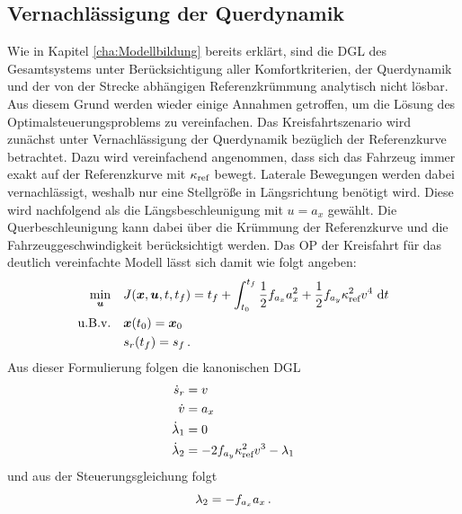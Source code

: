 \subsection{Vernachlässigung der Querdynamik}\label{subsec:Kreisfahrt_ohne_Querdynamik}
Wie in Kapitel \ref{cha:Modellbildung} bereits erklärt, sind die \gls{DGL} des Gesamtsystems unter Berücksichtigung aller Komfortkriterien, der Querdynamik und der von der Strecke abhängigen Referenzkrümmung analytisch nicht lösbar. Aus diesem Grund werden wieder einige Annahmen getroffen, um die Lösung des Optimalsteuerungsproblems zu vereinfachen. Das Kreisfahrtszenario wird zunächst unter Vernachlässigung der Querdynamik bezüglich der Referenzkurve betrachtet. Dazu wird vereinfachend angenommen, dass sich das Fahrzeug immer exakt auf der Referenzkurve mit $\kappa_{\textrm{ref}}$ bewegt. Laterale Bewegungen werden dabei vernachlässigt, weshalb nur eine Stellgröße in Längsrichtung benötigt wird. Diese wird nachfolgend als die Längsbeschleunigung mit $u = a_x$ gewählt. Die Querbeschleunigung kann dabei über die Krümmung der Referenzkurve und die Fahrzeuggeschwindigkeit berücksichtigt werden. Das \gls{OP} der Kreisfahrt für das deutlich vereinfachte Modell lässt sich damit wie folgt angeben: 
\begin{align}
\min_{\boldsymbol{u}} \quad & J(\boldsymbol{x},\boldsymbol{u},t,t_f) = t_f + \int_{t_0}^{t_f}\frac{1}{2}f_{a_x} a_x^2 + \frac{1}{2}f_{a_y} \kappa_{\textrm{ref}}^2v^4~\textrm{d}{t} \\
\textrm{u.B.v.} \quad& \boldsymbol{x}(t_0) = \boldsymbol{x}_0 \\
& s_r(t_f ) = s_f\,.
\end{align}
Aus dieser Formulierung folgen die kanonischen \gls{DGL} 
\begin{align}
\dot{s}_r &= v \\
\dot{v} &= a_x \label{eq:dot_v_ax}\\
\dot{\lambda}_1 &= 0 \\
\dot{\lambda}_2 &= -2f_{a_y} \kappa_{\textrm{ref}}^2v^3 - \lambda_1 \label{eq:dot_l2_Kreisfahrt}
\end{align}
und aus der Steuerungsgleichung folgt
\begin{equation}
	\lambda_2 = -f_{a_x} a_x\,. \label{eq:l2_Kreisfahrt}
\end{equation}
